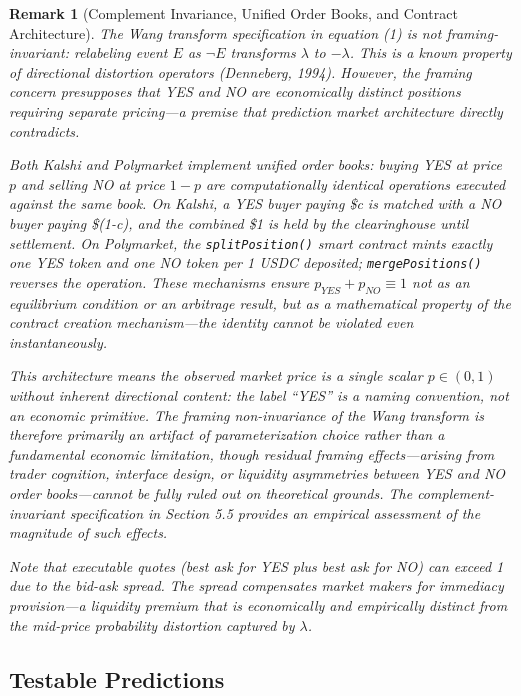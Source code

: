 \documentclass[12pt,a4paper]{article}
\newtheorem{remark}{Remark}
\begin{document}
\begin{remark}[Complement Invariance, Unified Order Books, and Contract Architecture]
The Wang transform specification in equation (1) is not framing-invariant: relabeling event $E$ as $\neg E$ transforms $\lambda$ to $-\lambda$. This is a known property of directional distortion operators (Denneberg, 1994). However, the framing concern presupposes that YES and NO are economically distinct positions requiring separate pricing---a premise that prediction market architecture directly contradicts.

Both Kalshi and Polymarket implement \textit{unified order books}: buying YES at price $p$ and selling NO at price $1-p$ are computationally identical operations executed against the same book. On Kalshi, a YES buyer paying \$c is matched with a NO buyer paying \$(1-c), and the combined \$1 is held by the clearinghouse until settlement. On Polymarket, the \texttt{splitPosition()} smart contract mints exactly one YES token and one NO token per 1 USDC deposited; \texttt{mergePositions()} reverses the operation. These mechanisms ensure $p_{YES} + p_{NO} \equiv 1$ not as an equilibrium condition or an arbitrage result, but as a \textit{mathematical property of the contract creation mechanism}---the identity cannot be violated even instantaneously.

This architecture means the observed market price is a single scalar $p \in (0,1)$ without inherent directional content: the label ``YES'' is a naming convention, not an economic primitive. The framing non-invariance of the Wang transform is therefore primarily an artifact of parameterization choice rather than a fundamental economic limitation, though residual framing effects---arising from trader cognition, interface design, or liquidity asymmetries between YES and NO order books---cannot be fully ruled out on theoretical grounds. The complement-invariant specification in Section 5.5 provides an empirical assessment of the magnitude of such effects.

Note that executable quotes (best ask for YES plus best ask for NO) \textit{can} exceed 1 due to the bid-ask spread. The spread compensates market makers for immediacy provision---a liquidity premium that is economically and empirically distinct from the mid-price probability distortion captured by $\lambda$.
\end{remark}

\subsection{Testable Predictions}\label{testable-predictions}
\end{document}
